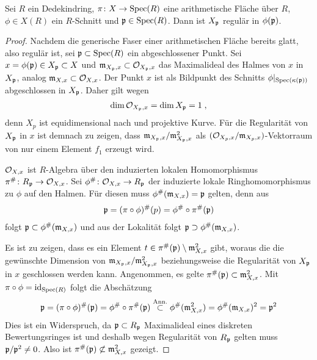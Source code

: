 \begin{Lemma}\label{thm:arithflschnittbilderglatt}
  Sei $R$ ein Dedekindring,
  $\pi\colon X\to\operatorname{Spec}(R)$ eine arithmetische Fläche über $R$,
  ${\phi\in X(R)}$ ein $R$-Schnitt und $\mathfrak{p}\in\operatorname{Spec}(R)$.
  Dann ist $X_{\mathfrak{p}}$ regulär in $\phi(\mathfrak{p})$.
  \begin{proof}
    Nachdem die generische Faser einer arithmetischen Fläche bereits
    glatt, also regulär ist, sei $\mathfrak{p}\subset\operatorname{Spec}(R)$ ein abgeschlossener
    Punkt.
    Sei $x=\phi(\mathfrak{p})\in X_{\mathfrak{p}}\subset X$ und $\mathfrak{m}_{X_{\mathfrak{p}},x}\subset\mathcal{O}_{X_{\mathfrak{p}},x}$
    das Maximalideal des Halmes von $x$ in $X_{\mathfrak{p}}$,
    analog $\mathfrak{m}_{X,x}\subset\mathcal{O}_{X,x}$.
    Der Punkt $x$ ist als Bildpunkt des Schnitts
    $\phi|_{\operatorname{Spec}(\kappa(\mathfrak{p}))}$ abgeschlossen in $X_{\mathfrak{p}}$.
    Daher gilt wegen \cite[Corollary~2.5.24]{liu}
    \begin{gather*}
      \dim\mathcal{O}_{X_{\mathfrak{p}},x}=\dim X_{\mathfrak{p}}=1\;,
    \end{gather*}
    denn $X_p$ ist equidimensional nach
    \cite[Proposition~4.4.16]{liu} und projektive Kurve.
    Für die Regularität von $X_{\mathfrak{p}}$ in $x$ ist demnach zu zeigen,
    dass $\mathfrak{m}_{X_{\mathfrak{p}},x}/\mathfrak{m}_{X_{\mathfrak{p}},x}^2$ als $(\mathcal{O}_{X_p,x}/\mathfrak{m}_{X_p,x})$-Vektorraum
    von nur einem Element $f_1$ erzeugt wird.
    
    $\mathcal{O}_{X,x}$ ist $R$-Algebra über den induzierten lokalen
    Homomorphismus ${\pi^\#\colon R_{\mathfrak{p}}\to\mathcal{O}_{X,x}}$.
    Sei ${\phi^\#\colon\mathcal{O}_{X,x}\to R_{\mathfrak{p}}}$ der induzierte lokale
    Ringhomomorphismus zu $\phi$ auf den Halmen. Für diesen muss
    ${\phi^\#(\mathfrak{m}_{X,x})=\mathfrak{p}}$ gelten, denn aus
    \begin{gather*}
      {\ensuremath{\mathfrak{p}}=(\pi\circ\phi)^\#(p)=\phi^\#\circ\pi^\#(\ensuremath{\mathfrak{p}})}
    \end{gather*}
    folgt ${\mathfrak{p}\subset\phi^\#(\mathfrak{m}_{X,x})}$ und aus der Lokalität folgt
    ${\mathfrak{p}\supset\phi^\#(\mathfrak{m}_{X,x})}$.
    
    Es ist zu zeigen, dass es ein Element
    ${t\in\pi^\#(\mathfrak{p})\setminus\mathfrak{m}_{X,x}^2}$ gibt, woraus die
    die gewünschte Dimension von ${\mathfrak{m}_{X_{\mathfrak{p}},x}/\mathfrak{m}_{X_{\mathfrak{p}},x}^2}$
    beziehungsweise die Regularität von $X_{\mathfrak{p}}$ in $x$ geschlossen
    werden kann.
    Angenommen, es gelte ${\pi^\#(\mathfrak{p})\subset\mathfrak{m}_{X,x}^2}$.
    Mit ${\pi\circ\phi=\mathrm{id}_{\operatorname{Spec}(R)}}$ folgt die Abschätzung
    \begin{gather*}
      \mathfrak{p} = (\pi\circ\phi)^\#(\mathfrak{p})
      = \phi^\#\circ\pi^\#(\mathfrak{p})
      \overset{\text{Ann.}}{\subset} \phi^\#(\mathfrak{m}_{X,x}^2)
      = \phi^\#(\mathfrak{m}_{X,x})^2
      = \mathfrak{p}^2
    \end{gather*}
    Dies ist ein Widerspruch, da ${\mathfrak{p}\subset R_{\mathfrak{p}}}$ Maximalideal eines
    diskreten Bewertungsringes ist und deshalb wegen Regularität von
    $R_{\mathfrak{p}}$ gelten muss ${\mathfrak{p}/\mathfrak{p}^2\neq 0}$.
    Also ist ${\pi^\#(\mathfrak{p})\not\subset\mathfrak{m}_{X,x}^2}$ gezeigt.


\end{proof}
\end{Lemma}
